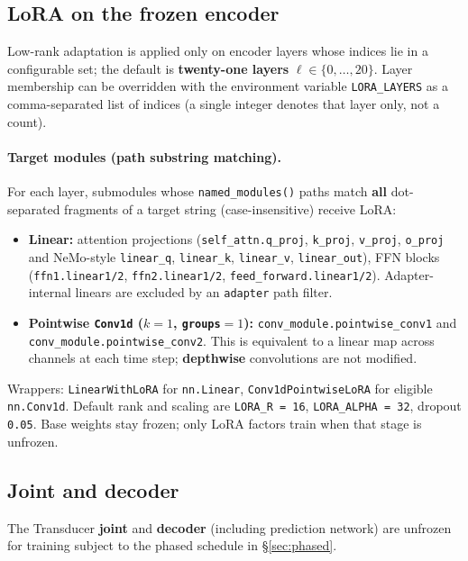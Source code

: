 \documentclass[11pt,a4paper]{article}
\begin{document}
\subsection{LoRA on the frozen encoder}
Low-rank adaptation is applied only on encoder layers whose indices lie in a configurable set; the default is \textbf{twenty-one layers} $\ell \in \{0,\ldots,20\}$. Layer membership can be overridden with the environment variable \texttt{LORA\_LAYERS} as a comma-separated list of indices (a single integer denotes that layer only, not a count).

\paragraph{Target modules (path substring matching).}
For each layer, submodules whose \texttt{named\_modules()} paths match \textbf{all} dot-separated fragments of a target string (case-insensitive) receive LoRA:
\begin{itemize}
  \item \textbf{Linear:} attention projections (\texttt{self\_attn.q\_proj}, \texttt{k\_proj}, \texttt{v\_proj}, \texttt{o\_proj} and NeMo-style \texttt{linear\_q}, \texttt{linear\_k}, \texttt{linear\_v}, \texttt{linear\_out}), FFN blocks (\texttt{ffn1.linear1/2}, \texttt{ffn2.linear1/2}, \texttt{feed\_forward.linear1/2}). Adapter-internal linears are excluded by an \texttt{adapter} path filter.
  \item \textbf{Pointwise \texttt{Conv1d} ($k{=}1$, \texttt{groups}${=}1$):} \texttt{conv\_module.pointwise\_conv1} and \texttt{conv\_module.pointwise\_conv2}. This is equivalent to a linear map across channels at each time step; \textbf{depthwise} convolutions are not modified.
\end{itemize}
Wrappers: \texttt{LinearWithLoRA} for \texttt{nn.Linear}, \texttt{Conv1dPointwiseLoRA} for eligible \texttt{nn.Conv1d}. Default rank and scaling are \texttt{LORA\_R = 16}, \texttt{LORA\_ALPHA = 32}, dropout \texttt{0.05}. Base weights stay frozen; only LoRA factors train when that stage is unfrozen.

\subsection{Joint and decoder}
The Transducer \textbf{joint} and \textbf{decoder} (including prediction network) are unfrozen for training subject to the phased schedule in \S\ref{sec:phased}.

\end{document}
